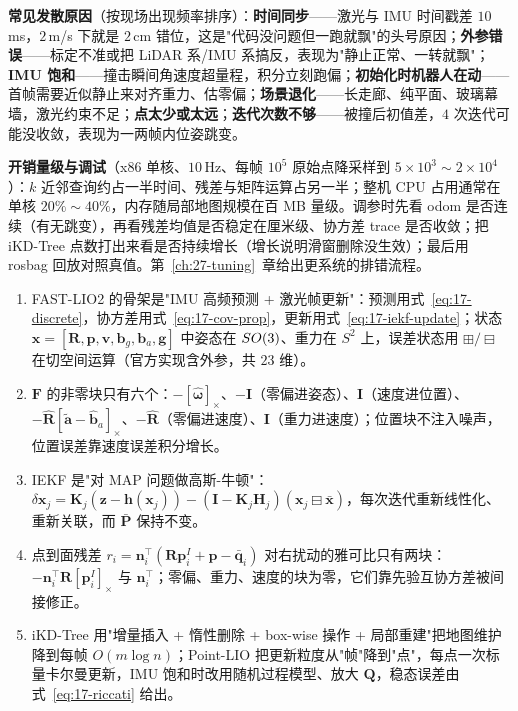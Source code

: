 \textbf{常见发散原因}（按现场出现频率排序）：\textbf{时间同步}——激光与 IMU 时间戳差 $10$\,ms，$2$\,m/s 下就是 $2$\,cm 错位，这是"代码没问题但一跑就飘"的头号原因；\textbf{外参错误}——标定不准或把 LiDAR 系/IMU 系搞反，表现为"静止正常、一转就飘"；\textbf{IMU 饱和}——撞击瞬间角速度超量程，积分立刻跑偏；\textbf{初始化时机器人在动}——首帧需要近似静止来对齐重力、估零偏；\textbf{场景退化}——长走廊、纯平面、玻璃幕墙，激光约束不足；\textbf{点太少或太远}；\textbf{迭代次数不够}——被撞后初值差，$4$ 次迭代可能没收敛，表现为一两帧内位姿跳变。

\textbf{开销量级与调试}（x86 单核、$10$\,Hz、每帧 $10^5$ 原始点降采样到 $5\times10^3\sim2\times10^4$）：$k$ 近邻查询约占一半时间、残差与矩阵运算占另一半；整机 CPU 占用通常在单核 $20\%\sim40\%$，内存随局部地图规模在百 MB 量级。调参时先看 odom 是否连续（有无跳变），再看残差均值是否稳定在厘米级、协方差 trace 是否收敛；把 iKD-Tree 点数打出来看是否持续增长（增长说明滑窗删除没生效）；最后用 rosbag 回放对照真值。第~\ref{ch:27-tuning}~章给出更系统的排错流程。

\begin{summary}

\begin{enumerate}
  \item FAST-LIO2 的骨架是"IMU 高频预测 + 激光帧更新"：预测用式~\eqref{eq:17-discrete}，协方差用式~\eqref{eq:17-cov-prop}，更新用式~\eqref{eq:17-iekf-update}；状态 $\bm{x}=[\bm{R},\bm{p},\bm{v},\bm{b}_g,\bm{b}_a,\bm{g}]$ 中姿态在 $SO(3)$、重力在 $S^2$ 上，误差状态用 $\boxplus/\boxminus$ 在切空间运算（官方实现含外参，共 $23$ 维）。
  \item $\bm{F}$ 的非零块只有六个：$-[\hat{\bm{\omega}}]_\times$、$-\bm{I}$（零偏进姿态）、$\bm{I}$（速度进位置）、$-\hat{\bm{R}}[\tilde{\bm{a}}-\hat{\bm{b}}_a]_\times$、$-\hat{\bm{R}}$（零偏进速度）、$\bm{I}$（重力进速度）；位置块不注入噪声，位置误差靠速度误差积分增长。
  \item IEKF 是"对 MAP 问题做高斯-牛顿"：$\delta\bm{x}_j=\bm{K}_j(\bm{z}-\bm{h}(\bm{x}_j))-(\bm{I}-\bm{K}_j\bm{H}_j)(\bm{x}_j\boxminus\bar{\bm{x}})$，每次迭代重新线性化、重新关联，而 $\bar{\bm{P}}$ 保持不变。
  \item 点到面残差 $r_i=\bm{n}_i^{\top}(\bm{R}\bm{p}_i^{I}+\bm{p}-\bar{\bm{q}}_i)$ 对右扰动的雅可比只有两块：$-\bm{n}_i^{\top}\bm{R}[\bm{p}_i^{I}]_\times$ 与 $\bm{n}_i^{\top}$；零偏、重力、速度的块为零，它们靠先验互协方差被间接修正。
  \item iKD-Tree 用"增量插入 + 惰性删除 + box-wise 操作 + 局部重建"把地图维护降到每帧 $O(m\log n)$；Point-LIO 把更新粒度从"帧"降到"点"，每点一次标量卡尔曼更新，IMU 饱和时改用随机过程模型、放大 $\bm{Q}$，稳态误差由式~\eqref{eq:17-riccati} 给出。
\end{enumerate}


\end{summary}

